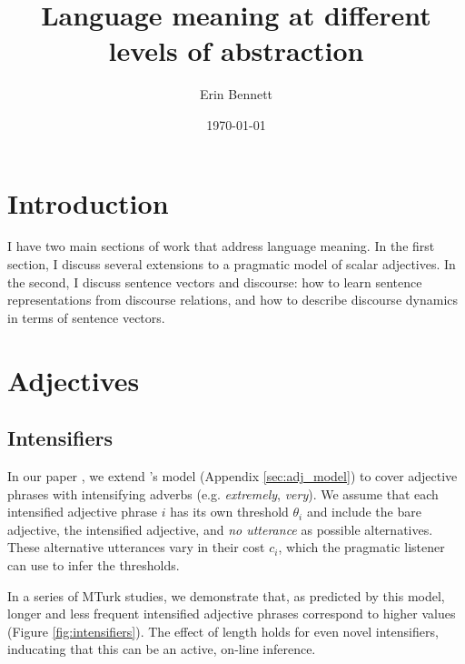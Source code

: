 \documentclass{article}
\title{Language meaning at different levels of abstraction}
\author{Erin Bennett}
\date{\today}
\newcommand{\w}[1]{\emph{#1}}
\begin{document}
   \maketitle
   
   \section{Introduction}

   I have two main sections of work that address language meaning.
   In the first section, I discuss several extensions to a pragmatic model of scalar adjectives.
   In the second, I discuss sentence vectors and discourse: how to learn sentence representations from discourse relations, and how to describe discourse dynamics in terms of sentence vectors.

   \section{Adjectives}

   \subsection{Intensifiers}

   In our paper \cite{BennettGoodman2018}, we extend 's model (Appendix \ref{sec:adj_model}) to cover adjective phrases with intensifying adverbs (e.g. \w{extremely}, \w{very}).
   We assume that each intensified adjective phrase $i$ has its own threshold $\theta_i$ and include the bare adjective, the intensified adjective, and \w{no utterance} as possible alternatives.
   These alternative utterances vary in their cost $c_i$, which the pragmatic listener can use to infer the thresholds.

   In a series of MTurk studies, we demonstrate that, as predicted by this model, longer and less frequent intensified adjective phrases correspond to higher values (Figure \ref{fig:intensifiers}).
   The effect of length holds for even novel intensifiers, inducating that this can be an active, on-line inference.
\end{document}
